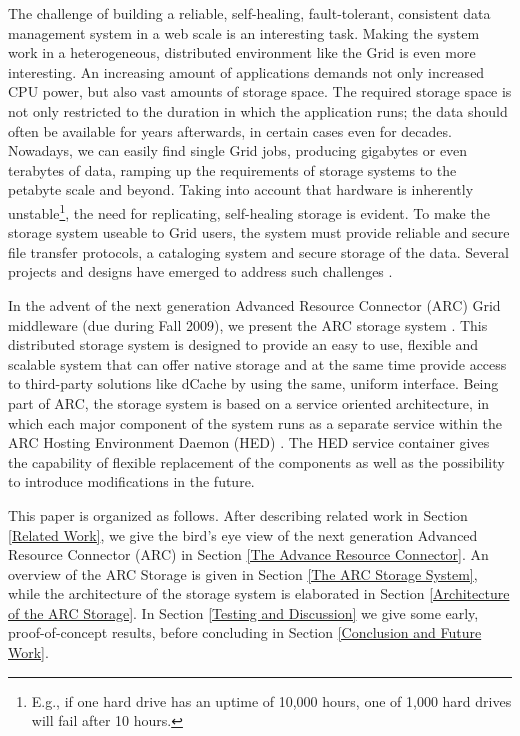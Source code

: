 \documentclass[final]{ieee}
\begin{document}
The challenge of building a reliable, self-healing, fault-tolerant,
consistent data management system in a web scale is an interesting
task. Making the system work in a heterogeneous, distributed
environment like the Grid is even more interesting. An increasing
amount of applications demands not only increased CPU power, but also
vast amounts of storage space. The required storage space is not only
restricted to the duration in which the application runs; the data
should often be available for years afterwards, in certain cases even
for decades. Nowadays, we can easily find single Grid jobs, producing
gigabytes or even terabytes of data, ramping up the requirements of
storage systems to the petabyte scale and beyond. Taking into account
that hardware is inherently unstable\footnote{E.g., if one hard drive
  has an uptime of 10,000 hours, one of 1,000 hard drives will fail
  after 10 hours.}, the need for replicating, self-healing storage is evident. To
make the storage system useable to Grid users, the system must provide
reliable and secure file transfer protocols, a cataloging system and
secure storage of the data. Several projects and designs have emerged
to address such challenges \cite{Hoschek00datamanagement,DengWang}.

In the advent of the next generation Advanced Resource Connector (ARC)
Grid middleware \cite{NorduGridsite} (due during Fall 2009), we present 
the ARC storage system \cite{ARCStoragedesigndoc}. This distributed
storage system is designed to provide an easy
to use, flexible and scalable system that can offer native storage and
at the same time provide access to third-party solutions like dCache by
using the same, uniform interface. Being part of ARC, the
storage system is based on a service
oriented architecture, in which each major component of the
system runs as a separate service within the ARC Hosting Environment
Daemon (HED) \cite{HEDdesigndoc}. The HED service container gives the
capability of flexible replacement of the components as well as the
possibility to introduce modifications in the future. %

This paper is organized as follows. After describing
related work in Section \ref{Related Work}, we give the bird's eye
view of the next generation Advanced Resource Connector (ARC) in
Section \ref{The Advance Resource Connector}. An overview of the
ARC Storage is given in Section \ref{The ARC Storage System}, while
the architecture of the storage system is elaborated in Section
\ref{Architecture of the ARC Storage}. In Section \ref{Testing and
  Discussion} we give some early, proof-of-concept results, before 
concluding in Section \ref{Conclusion and Future Work}. 
\end{document}
